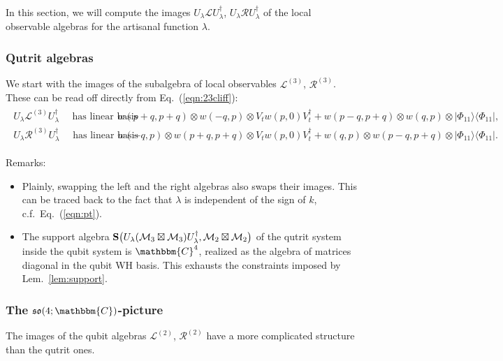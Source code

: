 \documentclass[aps,nofootinbib,floatfix,a4paper]{revtex4}
\newcommand{\1}{\mbox{$\mathbf{1}$}}
\def\Spp{{\bf S}}
\def\CC{\mathbbm{C}}
\def\M{\mathcal{M}}
\begin{document}
%

In this section, we will compute the images 
$U_\lambda \mathcal{L} U_\lambda^\dagger$, 
$U_\lambda \mathcal{R} U_\lambda^\dagger$
of the local observable algebras for the artisanal function $\lambda$. 

\subsubsection{Qutrit algebras}
\label{sec:qutrit_algebras}

We start with the images of the subalgebra of local observables 
$\mathcal{L}^{(3)}$,
$\mathcal{R}^{(3)}$.
These can be read off directly from Eq.~(\ref{eqn:23cliff}):
\begin{align*}
	\begin{split}
		U_\lambda \mathcal{L}^{(3)} U_\lambda^\dagger
		\quad\text{ has linear basis }\quad
		&w(p+q, p+q)\otimes w(-q, p) \otimes V_t w(p,0) V_t^\dagger
		+
		w(p-q, p+q)\otimes w(q, p) \otimes |\Phi_{11}\rangle\langle\Phi_{11}|, \\
		U_\lambda \mathcal{R}^{(3)} U_\lambda^\dagger
		\quad\text{ has linear basis }\quad
		&w(-q, p)\otimes w(p+q, p+q)\otimes  V_t w(p,0) V_t^\dagger
		+
		w(q, p)\otimes w(p-q,p+q) \otimes |\Phi_{11}\rangle\langle\Phi_{11}|.
	\end{split}
\end{align*}

Remarks:
\begin{itemize}
	\item
		Plainly,
		swapping the left and the right algebras also swaps their images.
		This can be traced back to the fact that $\lambda$ is independent of the sign of $k$, c.f.\ Eq.~(\ref{eqn:pt}).
	\item
		The support algebra  
		$
		\Spp\big(
			U_\lambda (\M_3\boxtimes \M_3) U_\lambda^\dagger,
			\M_2 \boxtimes \M_2
		\big)
		$
		of the qutrit system inside the qubit system is $\CC^4$, realized as the algebra of matrices diagonal in the qubit WH basis.
		This exhausts the constraints imposed by Lem.~\ref{lem:support}.
\end{itemize}

\subsubsection{The $\mathfrak{so}(4;\CC)$-picture}
\label{sec:lie}

The images of the qubit algebras
$\mathcal{L}^{(2)}$,
$\mathcal{R}^{(2)}$
have a more complicated structure than the qutrit ones.
\end{document}
